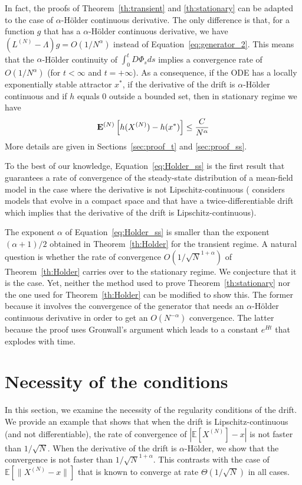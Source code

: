 \documentclass[sigconf]{acmart}
\newcommand\XN{X^{(N)}}
\newcommand\LN{L^{(N)}}
\newcommand\sesp[1]{\mathbb{E}[#1]}
\newcommand\espN[1]{{\mathchoice{\bespN{#1}}{\sespN{#1}}{\sespN{#1}}{\sespN{#1}}}}
\newcommand\bespN[1]{\mathbf{E}^{(N)}\left[#1\right]}
\newcommand\sespN[1]{\mathbf{E}^{(N)}[#1]}
\newcommand\snorm[1]{\|#1\|}
\begin{document}
In fact, the proofs of Theorem~\ref{th:transient} and
\ref{th:stationary} can be adapted to the case of $\alpha$-Hölder
continuous derivative. The only difference is that, for a function $g$
that has a $\alpha$-Hölder continuous derivative, we have
$(\LN-\Lambda)g=O(1/N^\alpha)$ instead of
Equation~\eqref{eq:generator_2}. This means that the $\alpha$-Hölder
continuity of $\int_0^tD\Phi_sds$ implies a convergence rate of
$O(1/N^\alpha)$ (for $t<\infty$ and $t=+\infty$). As a consequence, if
the ODE has a locally exponentially stable attractor $x^*$, if the
derivative of the drift is $\alpha$-Hölder continuous and if $h$
equals $0$ outside a bounded set, then in stationary regime we have
\begin{align}
  \label{eq:Holder_ss}
  \espN{h(\XN)-h(x^*)} \le \frac{C}{N^\alpha}
\end{align}
More details are given in Sections~\ref{sec:proof_t} and
\ref{sec:proof_ss}.

To the best of our knowledge, Equation~\eqref{eq:Holder_ss} is the
first result that guarantees a rate of convergence of the steady-state
distribution of a mean-field model in the case where the derivative is
not Lipschitz-continuous (\cite{ying2016rate} considers models that
evolve in a compact space and that have a twice-differentiable drift
which implies that the derivative of the drift is
Lipschitz-continuous).

The exponent $\alpha$ of Equation~\eqref{eq:Holder_ss} is smaller than
the exponent $(\alpha+1)/2$ obtained in Theorem~\ref{th:Holder} for
the transient regime.  A natural question is whether the rate of
convergence $O(1/\sqrt{N}^{1+\alpha})$ of Theorem~\ref{th:Holder}
carries over to the stationary regime. We conjecture that it is the
case.  Yet, neither the method used to prove
Theorem~\ref{th:stationary} nor the one used for
Theorem~\ref{th:Holder} can be modified to show this. The former
because it involves the convergence of the generator that needs an
$\alpha$-Hölder continuous derivative in order to get an
$O(N^{-\alpha})$ convergence. The latter because the proof uses
Gronwall's argument which leads to a constant $e^{Ht}$ that explodes
with time.




\section{Necessity of the conditions}
\label{sec:numerical}

In this section, we examine the necessity of the regularity conditions
of the drift. We provide an example that shows that when the drift is
Lipschitz-continuous (and not differentiable), the rate of convergence
of $|\sesp{\XN}-x|$ is not faster than $1/\sqrt{N}$. When the
derivative of the drift is $\alpha$-Hölder, we show that the
convergence is not faster than $1/\sqrt{N}^{1+\alpha}$.  This
contrasts with the case of $\sesp{\snorm{\XN-x}}$ that is known to
converge at rate $\Theta(1/\sqrt{N})$ in all cases.
\end{document}
